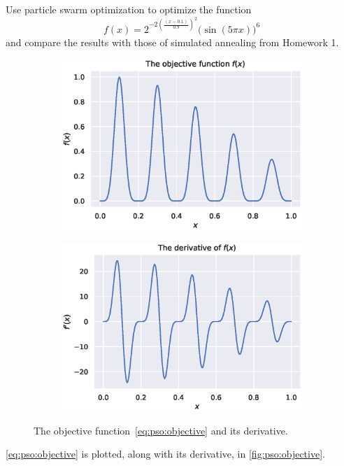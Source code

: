 \documentclass[12pt]{article}
\begin{document}
Use particle swarm optimization to optimize the function
\begin{equation}
    f(x) = 2^{-2{\left(\frac{(x - 0.1)}{0.9}\right)}^2}{\big(\sin(5\pi x)\big)}^6\label{eq:pso:objective}
\end{equation}
and compare the results with those of simulated annealing from Homework 1.
\begin{figure}
    \centering
    \begin{subfigure}[b]{0.49\textwidth}
        \centering
        \includegraphics[width=\textwidth]{figures/prob1-function.eps}
    \end{subfigure}
    \begin{subfigure}[b]{0.49\textwidth}
        \centering
        \includegraphics[width=\textwidth]{figures/prob1-derivative.eps}
    \end{subfigure}
    \caption{The objective function~\ref{eq:pso:objective} and its derivative.}\label{fig:pso:objective}
\end{figure}
\autoref{eq:pso:objective} is plotted, along with its derivative, in \autoref{fig:pso:objective}.
\end{document}
